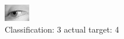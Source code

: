 \begin{figure}[h!]
\begin{center}
\includegraphics[width=0.60\columnwidth]{figures/ID2921_class_3_target_4.png}
\end{center}
\caption{ Classification: 3 actual target: 4}
\label{fig:ID2921_class_3_target_4}
\end{figure}
